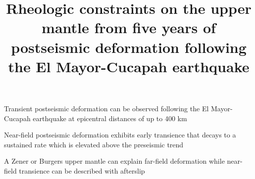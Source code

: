\documentclass[draft,linenumbers]{AGUJournal}
\begin{document}
\title{Rheologic constraints on the upper mantle from five years of postseismic deformation following the El Mayor-Cucapah earthquake}







\begin{keypoints}
\item Transient postseismic deformation can be observed following the El Mayor-Cucapah earthquake at epicentral distances of up to 400 km

\item Near-field postseismic deformation exhibits early transience that decays to a sustained rate which is elevated above the preseismic trend 

\item A Zener or Burgers upper mantle can explain far-field deformation while near-field transience can be described with afterslip
\end{keypoints}
\end{document}

